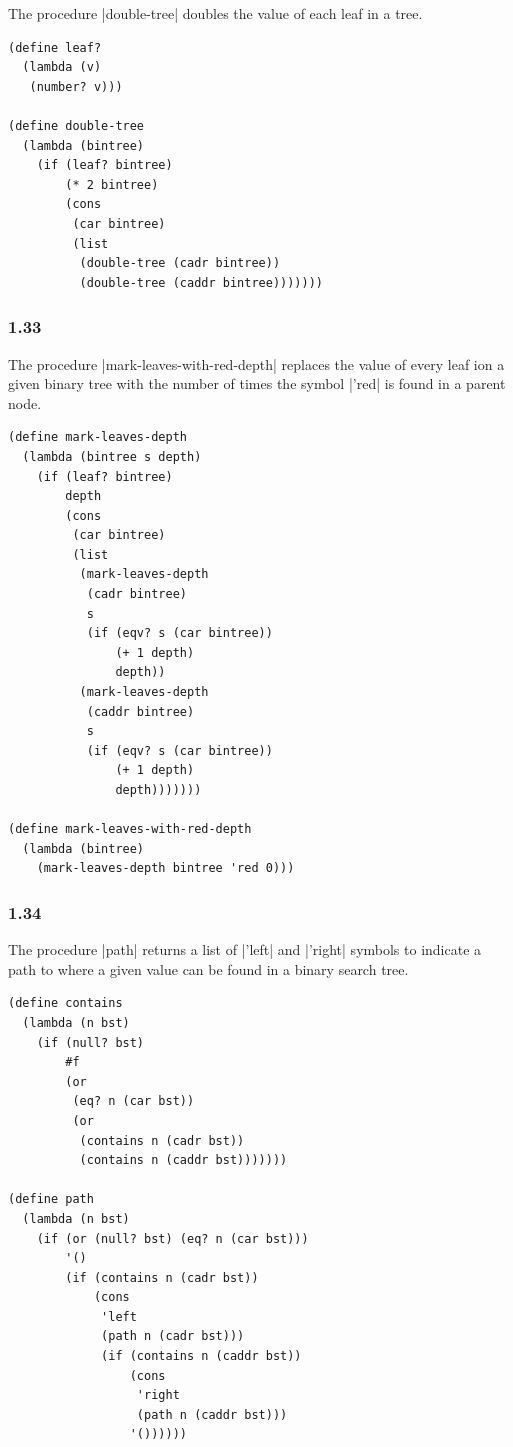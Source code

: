 \documentclass[a4paper]{article}
\begin{document}
The procedure |double-tree| doubles the value of each leaf in a tree.

\begin{lstlisting}
(define leaf?
  (lambda (v)
   (number? v)))

(define double-tree
  (lambda (bintree)
    (if (leaf? bintree)
        (* 2 bintree)
        (cons
         (car bintree)
         (list
          (double-tree (cadr bintree))
          (double-tree (caddr bintree)))))))
\end{lstlisting}

\subsubsection*{1.33}

The procedure |mark-leaves-with-red-depth| replaces the value of every leaf ion a given binary tree with the number of times the symbol |'red| is found in a parent node.

\begin{lstlisting}
(define mark-leaves-depth
  (lambda (bintree s depth)
    (if (leaf? bintree)
        depth
        (cons
         (car bintree)
         (list
          (mark-leaves-depth
           (cadr bintree)
           s
           (if (eqv? s (car bintree))
               (+ 1 depth)
               depth))
          (mark-leaves-depth
           (caddr bintree)
           s
           (if (eqv? s (car bintree))
               (+ 1 depth)
               depth)))))))

(define mark-leaves-with-red-depth
  (lambda (bintree)
    (mark-leaves-depth bintree 'red 0)))
\end{lstlisting}

\subsubsection*{1.34}

The procedure |path| returns a list of |'left| and |'right| symbols to indicate a path to where a given value can be found in a binary search tree.

\begin{lstlisting}
(define contains
  (lambda (n bst)
    (if (null? bst)
        #f
        (or
         (eq? n (car bst))
         (or
          (contains n (cadr bst))
          (contains n (caddr bst)))))))

(define path
  (lambda (n bst)
    (if (or (null? bst) (eq? n (car bst)))
        '()
        (if (contains n (cadr bst))
            (cons
             'left
             (path n (cadr bst)))
             (if (contains n (caddr bst))
                 (cons
                  'right
                  (path n (caddr bst)))
                 '())))))
\end{lstlisting}
\end{document}

